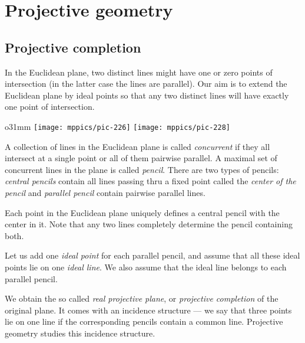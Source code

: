 \chapter{Projective geometry}\label{chap:proj}

\section*{Projective completion}

In the Euclidean plane, two distinct lines might have one or zero points of intersection 
(in the latter case the lines are parallel).
Our aim is to extend the Euclidean plane by ideal points so that any two distinct lines will have exactly one point of intersection.

\begin{wrapfigure}{o}{31mm}
\centering
\texttt{[image: mppics/pic-226]}
\vskip4mm
\texttt{[image: mppics/pic-228]}
\end{wrapfigure}

A collection of lines in the Euclidean plane is called \emph{concurrent} if they all intersect at a single point or all of them pairwise parallel.
A maximal set of concurrent lines in the plane is called \emph{pencil}.
There are two types of pencils: 
\emph{central pencils} contain all lines passing thru a fixed point called the \emph{center of the pencil}
and  
\emph{parallel pencil} contain pairwise parallel lines.

Each point in the Euclidean plane uniquely defines a central pencil with the center in it.
Note that any two lines completely determine the pencil containing both.

Let us add one \emph{ideal point} for each parallel pencil,
and assume that all these ideal points lie on one \emph{ideal line}.
We also assume that the ideal line belongs to each parallel pencil.

We obtain the so called \emph{real projective plane}, or \emph{projective completion} of the original plane. 
It comes with an incidence structure --- we say that three points lie on one line if the corresponding pencils contain a common line.
Projective geometry studies this incidence structure.

